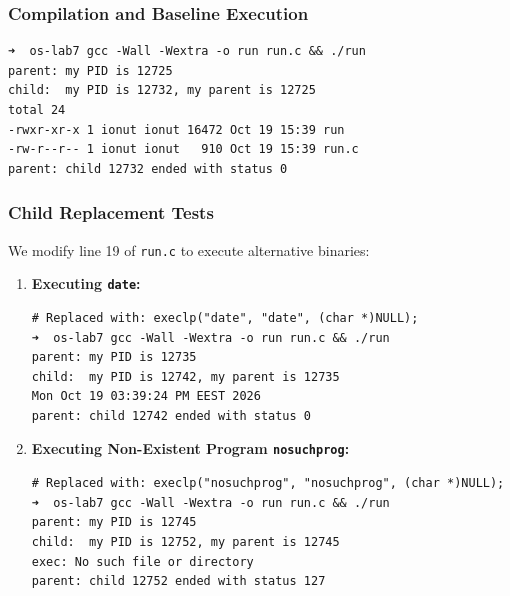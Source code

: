 \documentclass{labreport}
\begin{document}
\subsubsection{Compilation and Baseline Execution}
\begin{lstlisting}[style=bash]
➜  os-lab7 gcc -Wall -Wextra -o run run.c && ./run
parent: my PID is 12725
child:  my PID is 12732, my parent is 12725
total 24
-rwxr-xr-x 1 ionut ionut 16472 Oct 19 15:39 run
-rw-r--r-- 1 ionut ionut   910 Oct 19 15:39 run.c
parent: child 12732 ended with status 0
\end{lstlisting}

\subsubsection{Child Replacement Tests}
We modify line 19 of \texttt{run.c} to execute alternative binaries:
\begin{enumerate}[label=(\alph*)]
    \item \textbf{Executing \texttt{date}:}
\begin{lstlisting}[style=bash]
# Replaced with: execlp("date", "date", (char *)NULL);
➜  os-lab7 gcc -Wall -Wextra -o run run.c && ./run
parent: my PID is 12735
child:  my PID is 12742, my parent is 12735
Mon Oct 19 03:39:24 PM EEST 2026
parent: child 12742 ended with status 0
\end{lstlisting}

    \item \textbf{Executing Non-Existent Program \texttt{nosuchprog}:}
\begin{lstlisting}[style=bash]
# Replaced with: execlp("nosuchprog", "nosuchprog", (char *)NULL);
➜  os-lab7 gcc -Wall -Wextra -o run run.c && ./run
parent: my PID is 12745
child:  my PID is 12752, my parent is 12745
exec: No such file or directory
parent: child 12752 ended with status 127
\end{lstlisting}
\end{enumerate}
\end{document}
